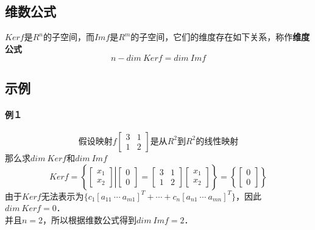 \documentclass[12pt]{article}
\begin{document}
\begin{CJK}{UTF8}{gbsn}
\section{维数公式}
$Kerf$是$R^n$的子空间，而$Imf$是$R^m$的子空间，它们的维度存在如下关系，称作\textbf{维度公式}$$n-dim\ Kerf = dim\ Imf$$
\subsection{示例}
\paragraph{例１}
\begin{equation}
\text{假设映射}f\left[\begin{array}{cc}
3 & 1\\
1 & 2
\end{array}
\right]\text{是从}R^2\text{到}R^2\text{的线性映射}
\end{equation}
那么求$dim\ Kerf$和$dim\ Imf$
\begin{equation}
Kerf = \left\lbrace
\left[
\left.
\begin{array}{c}
x_1\\x_2
\end{array}
\right]
\right|
\left[
\begin{array}{c}
0\\0
\end{array}
\right]
=
\left[
\begin{array}{cc}
3 & 1\\
1 & 2
\end{array}
\right]
\left[
\begin{array}{c}
x_1\\x_2
\end{array}
\right]
\right\rbrace
=
\left\lbrace
\left[
\begin{array}{c}
0\\0
\end{array}
\right]
\right\rbrace
\end{equation}
由于$Kerf$无法表示为$\lbrace c_1[a_{11}\ \cdots\ a_{m1}]^T + \cdots + c_n[a_{n1}\ \cdots\ a_{mn}]^T\rbrace$，因此$dim\ Kerf=0$．\\
并且$n=2$，所以根据维数公式得到$dim\ Imf=2$．

\end{CJK}
\end{document}
